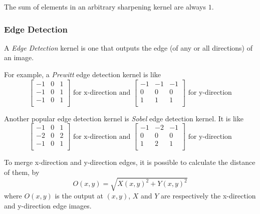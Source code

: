 \documentclass{note}
\begin{document}
\begin{note}
    The sum of elements in an arbitrary sharpening kernel are always $1$.
\end{note}

\subsubsection{Edge Detection}

A \textit{Edge Detection} kernel is one that outputs the edge (of any or all directions) of an image.

For example, a \textit{Prewitt} edge detection kernel is like
\begin{equation*}
    \begin{bmatrix}
        -1 & 0 & 1 \\
        -1 & 0 & 1 \\
        -1 & 0 & 1 \\
    \end{bmatrix}
    \text{ for x-direction and }
    \begin{bmatrix}
        -1 & -1 & -1 \\
         0 &  0 &  0 \\
         1 &  1 &  1 \\
    \end{bmatrix}
    \text{ for y-direction}
\end{equation*}

Another popular edge detection kernel is \textit{Sobel} edge detection kernel. It is like
\begin{equation*}
    \begin{bmatrix}
        -1 & 0 & 1 \\
        -2 & 0 & 2 \\
        -1 & 0 & 1 \\
    \end{bmatrix}
    \text{ for x-direction and }
    \begin{bmatrix}
        -1 & -2 & -1 \\
         0 &  0 &  0 \\
         1 &  2 &  1 \\
    \end{bmatrix}
    \text{ for y-direction}
\end{equation*}

To merge x-direction and y-direction edges, it is possible to calculate the distance of them, by
\begin{equation*}
    O(x, y) = \sqrt{X(x, y)^2 + Y(x, y)^2}
\end{equation*}
where $O(x, y)$ is the output at $(x, y)$, $X$ and $Y$ are respectively the x-direction and y-direction edge images.
\end{document}
